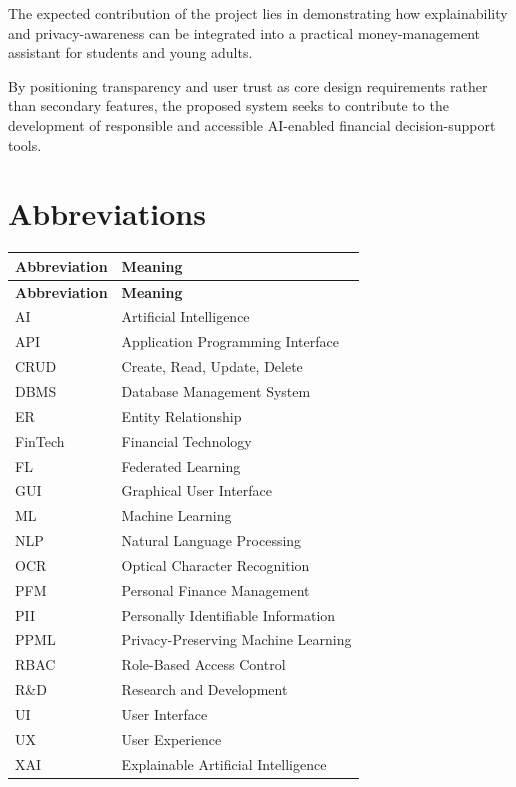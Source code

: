 \documentclass[12pt,a4paper]{report}
\begin{document}
The expected contribution of the project lies in demonstrating how explainability and privacy-awareness can be integrated into a practical money-management assistant for students and young adults.

By positioning transparency and user trust as core design requirements rather than secondary features, the proposed system seeks to contribute to the development of responsible and accessible AI-enabled financial decision-support tools.

\tableofcontents
\listoffigures
\listoftables

\chapter*{Abbreviations}
\begin{longtable}{p{3cm}p{11cm}}
\toprule
\textbf{Abbreviation} & \textbf{Meaning} \\
\midrule
\endfirsthead
\toprule
\textbf{Abbreviation} & \textbf{Meaning} \\
\midrule
\endhead
AI & Artificial Intelligence \\
API & Application Programming Interface \\
CRUD & Create, Read, Update, Delete \\
DBMS & Database Management System \\
ER & Entity Relationship \\
FinTech & Financial Technology \\
FL & Federated Learning \\
GUI & Graphical User Interface \\
ML & Machine Learning \\
NLP & Natural Language Processing \\
OCR & Optical Character Recognition \\
PFM & Personal Finance Management \\
PII & Personally Identifiable Information \\
PPML & Privacy-Preserving Machine Learning \\
RBAC & Role-Based Access Control \\
R\&D & Research and Development \\
UI & User Interface \\
UX & User Experience \\
XAI & Explainable Artificial Intelligence \\
\bottomrule
\end{longtable}
\end{document}
